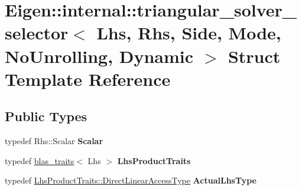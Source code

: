 \hypertarget{struct_eigen_1_1internal_1_1triangular__solver__selector_3_01_lhs_00_01_rhs_00_01_side_00_01_mod9d4c365fbf3ecd733e3c477f950cfbe8}{}\section{Eigen\+::internal\+::triangular\+\_\+solver\+\_\+selector$<$ Lhs, Rhs, Side, Mode, No\+Unrolling, Dynamic $>$ Struct Template Reference}
\label{struct_eigen_1_1internal_1_1triangular__solver__selector_3_01_lhs_00_01_rhs_00_01_side_00_01_mod9d4c365fbf3ecd733e3c477f950cfbe8}
\subsection*{Public Types}
\begin{DoxyCompactItemize}
\item 
\mbox{\label{struct_eigen_1_1internal_1_1triangular__solver__selector_3_01_lhs_00_01_rhs_00_01_side_00_01_mod9d4c365fbf3ecd733e3c477f950cfbe8_a6d6c1e5b5020b6a4ca32cd7a6c98b5f1}} 
typedef Rhs\+::\+Scalar {\bfseries Scalar}
\item 
\mbox{\label{struct_eigen_1_1internal_1_1triangular__solver__selector_3_01_lhs_00_01_rhs_00_01_side_00_01_mod9d4c365fbf3ecd733e3c477f950cfbe8_a4d6166a12a8835cfa49df66753a6d344}} 
typedef \mbox{\hyperlink{struct_eigen_1_1internal_1_1blas__traits}{blas\+\_\+traits}}$<$ Lhs $>$ {\bfseries Lhs\+Product\+Traits}
\item 
\mbox{\label{struct_eigen_1_1internal_1_1triangular__solver__selector_3_01_lhs_00_01_rhs_00_01_side_00_01_mod9d4c365fbf3ecd733e3c477f950cfbe8_ac3085f1dcf7811c4107bcbb8d8290205}} 
typedef \mbox{\hyperlink{struct_eigen_1_1internal_1_1true__type}{Lhs\+Product\+Traits\+::\+Direct\+Linear\+Access\+Type}} {\bfseries Actual\+Lhs\+Type}
\end{DoxyCompactItemize}
